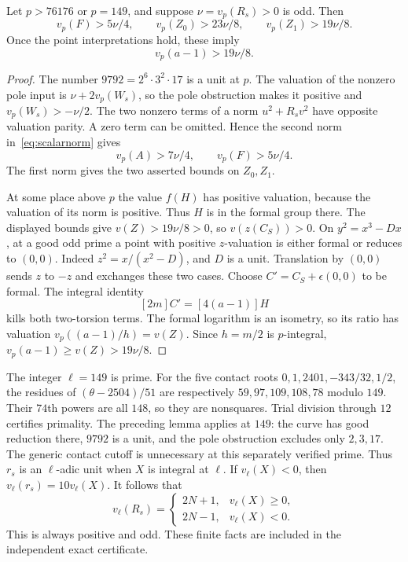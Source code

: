 \documentclass[11pt,a4paper]{article}
\begin{document}
\begin{lemma}\label{lem:scalarextract}
Let $p>76176$ or $p=149$, and suppose $\nu=v_p(R_s)>0$ is odd. Then
\[
 v_p(F)>5\nu/4,\qquad
 v_p(Z_0)>23\nu/8,\qquad v_p(Z_1)>19\nu/8.
\]
Once the point interpretations hold, these imply
\[
                v_p(a-1)>19\nu/8.
\]
\end{lemma}
\begin{proof}
The number $9792=2^6\cdot3^2\cdot17$ is a unit at $p$.
The valuation of the nonzero pole input is
$\nu+2v_p(W_s)$, so the pole obstruction makes it positive and
$v_p(W_s)>-\nu/2$.
The two nonzero terms of a norm $u^2+R_sv^2$ have opposite
valuation parity. A zero term can be omitted. Hence the second
norm in~\eqref{eq:scalarnorm} gives
\[
 v_p(A)>7\nu/4,\qquad v_p(F)>5\nu/4.
\]
The first norm gives the two asserted bounds on $Z_0,Z_1$.

At some place above $p$ the value $f(H)$ has positive valuation,
because the valuation of its norm is positive. Thus $H$ is in the
formal group there. The displayed bounds give $v(Z)>19\nu/8>0$,
so $v(z(C_S))>0$. On $y^2=x^3-Dx$, at a good odd prime a point
with positive $z$-valuation is either formal or reduces to $(0,0)$.
Indeed $z^2=x/(x^2-D)$, and $D$ is a unit. Translation by $(0,0)$
sends $z$ to $-z$ and exchanges these two cases. Choose
$C'=C_S+\epsilon(0,0)$ to be formal. The integral identity
\[
                       [2m]C'=[4(a-1)]H
\]
kills both two-torsion terms. The formal logarithm is an isometry,
so its ratio has valuation $v_p((a-1)/h)=v(Z)$. Since $h=m/2$ is
$p$-integral, $v_p(a-1)\ge v(Z)>19\nu/8$.
\end{proof}

The integer $\ell=149$ is prime. For the five contact roots
$0,1,2401,-343/32,1/2$, the residues of $(\theta-2504)/51$ are
respectively $59,97,109,108,78$ modulo $149$. Their $74$th powers
are all $148$, so they are nonsquares. Trial division through $12$
certifies primality. The preceding lemma applies at $149$: the curve
has good reduction there, $9792$ is a unit, and the pole obstruction
excludes only $2,3,17$. The generic contact cutoff is unnecessary
at this separately verified prime. Thus $r_s$ is an $\ell$-adic unit when $X$ is integral
at $\ell$. If $v_\ell(X)<0$, then $v_\ell(r_s)=10v_\ell(X)$.
It follows that
\begin{equation}\label{eq:forcedvaluation}
 v_\ell(R_s)=
 \begin{cases}2N+1,&v_\ell(X)\ge0,\\2N-1,&v_\ell(X)<0.
 \end{cases}
\end{equation}
This is always positive and odd. These finite facts are included
in the independent exact certificate.
\end{document}
